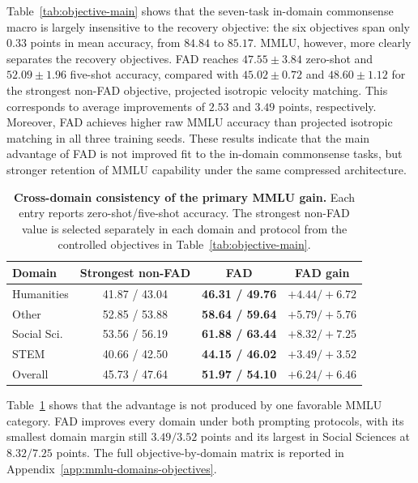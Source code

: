 \documentclass{article}
\theoremstyle{plain}
\theoremstyle{definition}
\theoremstyle{remark}
\begin{document}
Table~\ref{tab:objective-main} shows that the seven-task in-domain
commonsense macro is largely insensitive to the recovery objective: the six
objectives span only $0.33$ points in mean accuracy, from $84.84$ to $85.17$.
MMLU, however, more clearly separates the recovery objectives. FAD reaches
$47.55\pm3.84$ zero-shot and $52.09\pm1.96$ five-shot accuracy, compared with
$45.02\pm0.72$ and $48.60\pm1.12$ for the strongest non-FAD objective,
projected isotropic velocity matching. This corresponds to average improvements
of $2.53$ and $3.49$ points, respectively. Moreover, FAD achieves higher raw
MMLU accuracy than projected isotropic matching in all three training seeds.
These results indicate that the main advantage of FAD is not improved fit to
the in-domain commonsense tasks, but stronger retention of MMLU capability
under the same compressed architecture.

\begin{table}[H]
\caption{\textbf{Cross-domain consistency of the primary MMLU gain.}  Each entry
reports zero-shot/five-shot accuracy.  The strongest non-FAD value is selected
separately in each domain and protocol from the controlled objectives in
Table~\ref{tab:objective-main}.}
\label{tab:mmlu-domain-consistency}
\centering
\footnotesize
\setlength{\tabcolsep}{6.0pt}
\renewcommand{\arraystretch}{1.04}
\begin{tabular}{@{}lccc@{}}
\toprule
\textbf{Domain} & \textbf{Strongest non-FAD} & \textbf{FAD}
& \textbf{FAD gain}\\
\midrule
Humanities    & 41.87 / 43.04 & \textbf{46.31 / 49.76} & $+4.44 / +6.72$\\
Other         & 52.85 / 53.88 & \textbf{58.64 / 59.64} & $+5.79 / +5.76$\\
Social Sci.   & 53.56 / 56.19 & \textbf{61.88 / 63.44} & $+8.32 / +7.25$\\
STEM          & 40.66 / 42.50 & \textbf{44.15 / 46.02} & $+3.49 / +3.52$\\
\midrule
Overall       & 45.73 / 47.64 & \textbf{51.97 / 54.10} & $+6.24 / +6.46$\\
\bottomrule
\end{tabular}
\end{table}

Table~\ref{tab:mmlu-domain-consistency} shows that the advantage is not produced
by one favorable MMLU category.  FAD improves every domain under both prompting
protocols, with its smallest domain margin still $3.49/3.52$ points and its
largest in Social Sciences at $8.32/7.25$ points.  The full objective-by-domain
matrix is reported in Appendix~\ref{app:mmlu-domains-objectives}.
\end{document}
